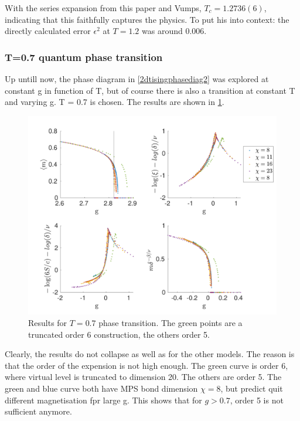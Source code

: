 With the series expansion from this paper and Vumps, $T_c=1.2736(6)$, indicating that this faithfully captures the physics. To put his into context: the directly calculated error $\epsilon^{2}$  at $T=1.2$ was around $0.006$.

\subsubsection{ T=0.7 quantum phase transition }\label{tphasetranssubsec}

Up untill now, the phase diagram in \cref{2dtisingphasediag2} was explored at constant g in function of T, but of course there is also a transition at constant T and varying g.  T = 0.7 is chosen. The results are shown in \cref{fig:phase:t07:full}.

\begin{figure}
  \center
  \includegraphics[width=\textwidth]{Figuren/phasediag/t07/full.pdf}
  \caption{Results for $T=0.7$ phase transition. The green points are a truncated order 6 construction, the others order 5.  }
  \label{fig:phase:t07:full}
\end{figure}

Clearly, the results do not collapse as well as for the other models. The reason is that the order of the expension is not high enough. The green curve is order 6, where virtual level is truncated to dimension 20. The others are order 5. The green and blue curve both have MPS bond dimension $\chi=8$, but predict quit different magnetisation fpr large g. This shows that for $g>0.7$, order 5 is not sufficient anymore.

